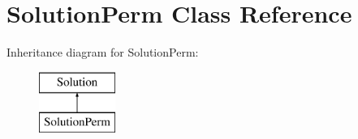 \hypertarget{class_solution_perm}{\section{Solution\+Perm Class Reference}
\label{class_solution_perm}
}
Inheritance diagram for Solution\+Perm\+:\begin{figure}[H]
\begin{center}
\leavevmode
\includegraphics[height=2.000000cm]{class_solution_perm}
\end{center}
\end{figure}
